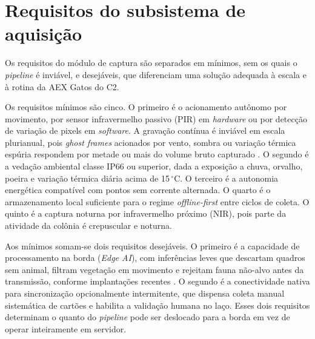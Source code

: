 \section{Requisitos do subsistema de aquisição}
\label{sec:cap2-requisitos}


Os requisitos do módulo de captura são separados em mínimos, sem os quais o \textit{pipeline} é inviável, e desejáveis, que diferenciam uma solução adequada à escala e à rotina da AEX Gatos do C2.


Os requisitos mínimos são cinco. O primeiro é o acionamento autônomo por movimento, por sensor infravermelho passivo (PIR) em \textit{hardware} ou por detecção de variação de pixels em \textit{software}. A gravação contínua é inviável em escala plurianual, pois \textit{ghost frames} acionados por vento, sombra ou variação térmica espúria respondem por metade ou mais do volume bruto capturado \cite{bruce2025largescale,velez2022choosing,swanson2015snapshot}. O segundo é a vedação ambiental classe IP66 ou superior, dada a exposição a chuva, orvalho, poeira e variação térmica diária acima de 15\,$^\circ$C. O terceiro é a autonomia energética compatível com pontos sem corrente alternada. O quarto é o armazenamento local suficiente para o regime \textit{offline-first} entre ciclos de coleta. O quinto é a captura noturna por infravermelho próximo (NIR), pois parte da atividade da colônia é crepuscular e noturna.


Aos mínimos somam-se dois requisitos desejáveis. O primeiro é a capacidade de processamento na borda (\textit{Edge AI}), com inferências leves que descartam quadros sem animal, filtram vegetação em movimento e rejeitam fauna não-alvo antes da transmissão, conforme implantações recentes \cite{velasco2024smartcameratraps,pishdast2025smartcameratraps,mulero2025addressing}. O segundo é a conectividade nativa para sincronização opcionalmente intermitente, que dispensa coleta manual sistemática de cartões e habilita a validação humana no laço. Esses dois requisitos determinam o quanto do \textit{pipeline} pode ser deslocado para a borda em vez de operar inteiramente em servidor.


